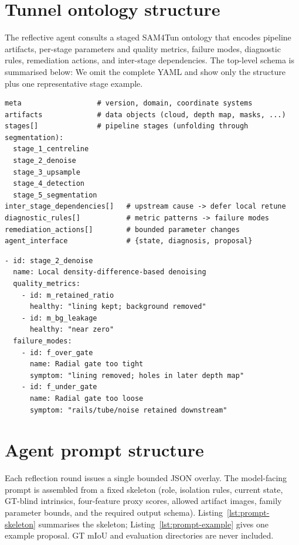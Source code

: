 \documentclass[a4paper,fleqn]{cas-dc}
\begin{document}
\section{Tunnel ontology structure}\label{app:ontology}

The reflective agent consults a staged SAM4Tun ontology that encodes pipeline
artifacts, per-stage parameters and quality metrics, failure modes, diagnostic
rules, remediation actions, and inter-stage dependencies. The top-level schema
is summarised below:
We omit the complete YAML and show only the structure plus one representative
stage example.

\begin{lstlisting}[caption={Ontology top-level keys and stage inventory.},label={lst:ontology-structure}]
meta                  # version, domain, coordinate systems
artifacts             # data objects (cloud, depth map, masks, ...)
stages[]              # pipeline stages (unfolding through segmentation):
  stage_1_centreline
  stage_2_denoise
  stage_3_upsample
  stage_4_detection
  stage_5_segmentation
inter_stage_dependencies[]   # upstream cause -> defer local retune
diagnostic_rules[]           # metric patterns -> failure modes
remediation_actions[]        # bounded parameter changes
agent_interface              # {state, diagnosis, proposal}
\end{lstlisting}

\begin{lstlisting}[caption={Example ontology stage: radial denoising failure modes.},label={lst:ontology-example}]
- id: stage_2_denoise
  name: Local density-difference-based denoising
  quality_metrics:
    - id: m_retained_ratio
      healthy: "lining kept; background removed"
    - id: m_bg_leakage
      healthy: "near zero"
  failure_modes:
    - id: f_over_gate
      name: Radial gate too tight
      symptom: "lining removed; holes in later depth map"
    - id: f_under_gate
      name: Radial gate too loose
      symptom: "rails/tube/noise retained downstream"
\end{lstlisting}

\section{Agent prompt structure}\label{app:prompt}

Each reflection round issues a single bounded JSON overlay. The model-facing
prompt is assembled from a fixed skeleton (role, isolation rules, current
state, GT-blind intrinsics, four-feature proxy scores, allowed artifact images,
family parameter bounds, and the required output schema). Listing~\ref{lst:prompt-skeleton}
summarises the skeleton; Listing~\ref{lst:prompt-example} gives one example
proposal. GT mIoU and evaluation directories are never included.
\end{document}
